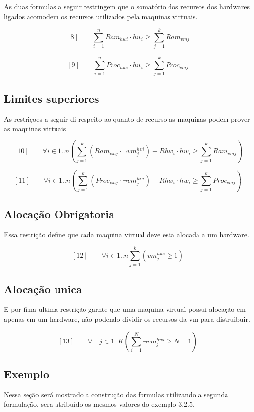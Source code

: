 As duas formulas a seguir restringem que o somatório dos recursos dos hardwares ligados acomodem os recursos utilizados pela maquinas virtuais.

$$[8] \qquad \sum_{i=1}^{n} Ram_{hwi} \cdot hw_{i} \geq \sum_{j=1}^{k} Ram_{vmj} $$

$$[9] \qquad \sum_{i=1}^{n} Proc_{hwi} \cdot hw_{i} \geq \sum_{j=1}^{k} Proc_{vmj} $$

\subsection{Limites superiores}

As restriçoes a seguir di respeito ao quanto de recurso as maquinas podem prover as maquinas virtuais


$$[10] \qquad \forall i \in 1..n (\sum_{j=1}^{k} (Ram_{vmj} \cdot \lnot{vm_{j}^{hwi}}) + Rhw_{i} \cdot hw_i \geq \sum_{j=1}^{k} Ram_{vmj})$$

$$[11] \qquad \forall i \in 1..n (\sum_{j=1}^{k} (Proc_{vmj} \cdot \lnot{vm_{j}^{hwi}}) + Rhw_{i} \cdot hw_i \geq \sum_{j=1}^{k} Proc_{vmj})$$

\subsection{Alocação Obrigatoria}

Essa restrição define que cada maquina virtual deve esta alocada a um hardware.

$$[12] \qquad \forall i \in 1..n  \sum_{j=1}^{k} (vm_j^{hwi} \geq 1)$$

\subsection{Alocação unica}

E por fima ultima restrição garnte que uma maquina virtual possui alocação em apenas em um hardware, não podendo dividir os recursos da vm para distruibuir.

$$[13] \qquad \forall \quad j  \in 1..K (\sum_{i=1}^{N} \lnot{vm_j^{hwi}} \geq N - 1)$$

\subsection{Exemplo}

Nessa seção será mostrado a construção das formulas utilizando a segunda formulação, sera atribuído os mesmos valores do exemplo 3.2.5.

